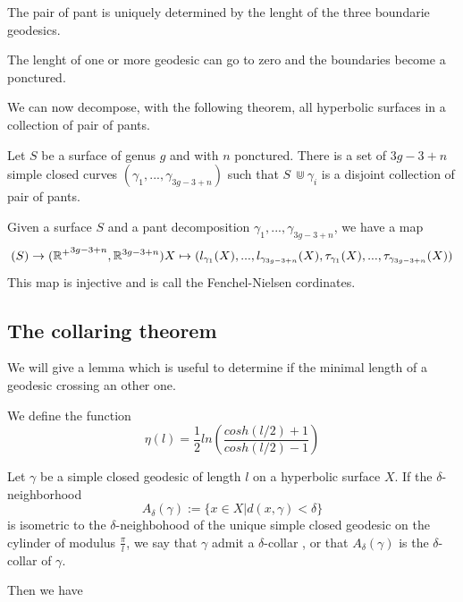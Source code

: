 \begin{rmq}
The pair of pant is uniquely determined by the lenght of the three boundarie geodesics.
\end{rmq}

\begin{rmq}
The lenght of one or more geodesic can go to zero and the boundaries become a ponctured.
\end{rmq}

We can now decompose, with the following theorem, all hyperbolic surfaces in a collection of pair of pants.

\begin{thm}
Let $S$ be a surface of genus $g$ and with $n$ ponctured. There is a set of $3g-3+n$ simple closed curves $(\gamma_1,...,\gamma_{3g-3+n})$ such that $S\ \Cup \gamma_i$ is a disjoint collection of pair of pants.
\end{thm}

\begin{dfnt}
Given a surface $S$ and a pant decomposition $\gamma_1,...,\gamma_{3g-3+n}$, we have a map \[
\mathcal(S) \rightarrow (\mathbb{R^{+}}^{3g-3+n},\mathbb{R}^{3g-3+n}) \\
X \mapsto (l_{\gamma_1}(X),...,l_{\gamma_{3g-3+n}}(X),\tau_{\gamma_1}(X),...,\tau_{\gamma_{3g-3+n}}(X))
\]
This map is injective and is call the Fenchel-Nielsen cordinates.
\end{dfnt}

\subsection{The collaring theorem}

We will give a lemma which is useful to determine if the minimal length of a geodesic crossing an other one.

We define the function \[
\eta(l)= \frac{1}{2} ln(\frac{cosh(l/2)+1}{cosh(l/2)-1})
\]

\begin{dfnt}
Let $\gamma$ be a simple closed geodesic of length $l$ on a hyperbolic surface $X$. If the $\delta$-neighborhood \[
A_\delta(\gamma):= \{ x \in X | d(x,\gamma) < \delta \}
\]
is isometric to the $\delta$-neighbohood of the unique simple closed geodesic on the cylinder of modulus $\frac{\pi}{l}$, we say that $\gamma$ admit a $\delta$-collar
, or that $A_\delta(\gamma)$ is the $\delta$-collar of $\gamma$.
\end{dfnt}

Then we have

